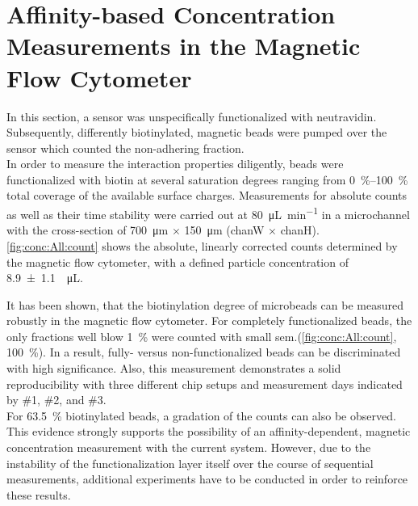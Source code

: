 \section{Affinity-based Concentration Measurements in the Magnetic Flow Cytometer}
\label{sec:res:affinity}
In this section, a sensor was unspecifically functionalized with neutravidin. Subsequently, differently biotinylated, magnetic beads were pumped over the sensor which counted the non-adhering fraction.\\
In order to measure the interaction properties diligently, beads were functionalized with biotin at several saturation degrees ranging from \SIrange{0}{100}{\percent} total coverage of the available surface charges. Measurements for absolute counts as well as their time stability were carried out at \SI{80}{\micro\liter\per\minute} in a microchannel with the cross-section of \SI{700}{\micro\meter} $\times$ \SI{150}{\micro\meter}  (\gls{chanW} $\times$ \gls{chanH}). \cref{fig:conc:All:count} shows the absolute, linearly corrected counts determined by the magnetic flow cytometer, with a defined particle concentration of \SI{8.9+-1.1}{\per\micro\liter}.

It has been shown, that the biotinylation degree of microbeads can be measured robustly in the magnetic flow cytometer. For completely functionalized beads, the only fractions well blow \SI{1}{\percent} were counted with small \gls{sem}.(\cref{fig:conc:All:count}, \SI{100}{\percent}). In a result, fully- versus non-functionalized beads can be discriminated with high significance. Also, this measurement demonstrates a solid reproducibility with three different chip setups and measurement days indicated by \#1, \#2, and \#3.\\
For \SI{63.5}{\percent} biotinylated beads, a gradation of the counts can also be observed. This evidence strongly supports the possibility of an affinity-dependent, magnetic concentration measurement with the current system. However, due to the instability of the functionalization layer itself over the course of sequential measurements, additional experiments have to be conducted in order to reinforce these results.

